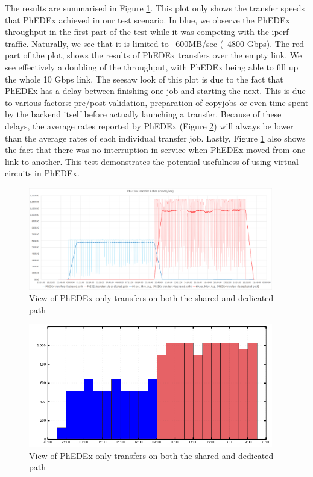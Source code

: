 The results are summarised in Figure \ref{fig:combined_transfers}. This plot only shows the transfer 
speeds that PhEDEx achieved in our test scenario. In blue, we observe the PhEDEx throughput in the first 
part of the test while it was competing with the iperf traffic. Naturally, we see that it is limited to 
~600MB/sec (~4800 Gbps). The red part of the plot, shows the results of PhEDEx transfers over the empty 
link. We see effectively a doubling of the throughput, with PhEDEx being able to fill up the whole 10 Gbps
 link.
The seesaw look of this plot is due to the fact that PhEDEx has a delay between finishing one job and 
starting the next. This is due to various factors: pre/post validation, preparation of copyjobs or 
even time spent by the backend itself before actually launching a transfer. Because of these delays, 
the average rates reported by PhEDEx (Figure \ref{fig:combined_phedex_transfers}) will always be lower 
than the average rates of each individual transfer job. 
Lastly, Figure \ref{fig:combined_transfers} also shows the fact that there was no interruption in service 
when PhEDEx moved from one link to another. This test demonstrates the potential usefulness of 
using virtual circuits in PhEDEx.

\begin{figure}[h]
  \centering
  \includegraphics[width=0.95\textwidth]{Figures/FileDownload_All_paths.png}
  \caption{View of PhEDEx-only transfers on both the shared and dedicated path}
  \label{fig:combined_transfers}
\end{figure} 

\begin{figure}[h]
  \centering
  \includegraphics[width=0.95\textwidth]{Figures/FileDownload_PhEDEx_all_paths.png}
  \caption{View of PhEDEx only transfers on both the shared and dedicated path}
  \label{fig:combined_phedex_transfers}
\end{figure} 

